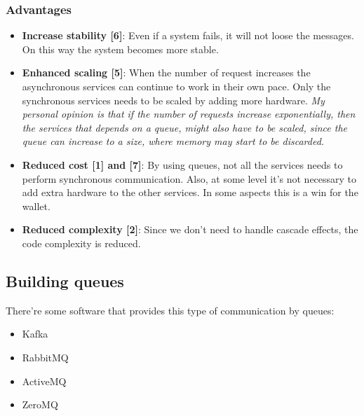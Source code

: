 \subsubsection{Advantages}

\begin{itemize}
    \item \textbf{Increase stability [6]}: Even if a system fails, it will not loose the messages.
    On this way the system becomes more stable. 
    \item \textbf{Enhanced scaling [5]}: When the number of request increases the asynchronous services
    can continue to work in their own pace. Only the synchronous services needs to be scaled by adding 
    more hardware. \textit{My personal opinion is that if the number of requests increase exponentially, 
    then the services that depends on a queue, might also have to be scaled, since the queue can increase 
    to a size, where memory may start to be discarded.}
    \item \textbf{Reduced cost [1] and [7]}: By using queues, not all the services needs to perform 
    synchronous communication. Also, at some level it's not necessary to add extra hardware to the 
    other services. In some aspects this is a win for the wallet. 
    \item \textbf{Reduced complexity [2]}: Since we don't need to handle cascade effects, the code complexity
    is reduced.  

\end{itemize}

\subsection{Building queues}
There're some software that provides this type of communication by queues: 

\begin{itemize}
    \item Kafka
    \item RabbitMQ
    \item ActiveMQ
    \item ZeroMQ
\end{itemize}

